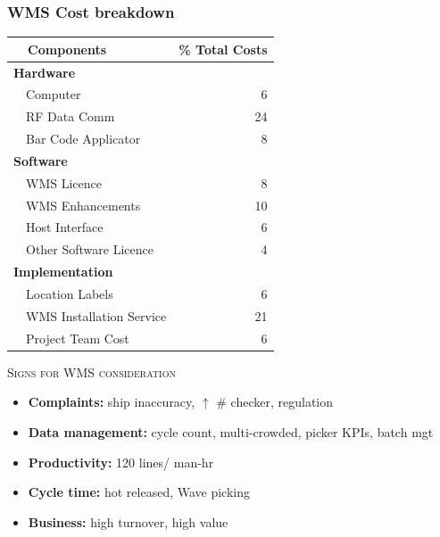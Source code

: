 \documentclass[10pt,handout,notes=show]{beamer}
\begin{document}
\begin{frame}
  \frametitle{WMS Cost breakdown}

          \begin{center}\scriptsize{
            \begin{tabular}{lr} \hline
              ~~Components          & \% Total Costs \\ \hline
              \multicolumn{2}{l}{\textbf{Hardware}} \\
              ~~Computer		        & 6 \\
              ~~RF Data Comm		    & 24 \\
              ~~Bar Code Applicator	& 8 \\
              \multicolumn{2}{l}{\textbf{Software}}  \\
              ~~WMS Licence	        & 8 \\
              ~~WMS Enhancements	  & 10 \\
              ~~Host Interface	    & 6\\
              ~~Other Software Licence	& 4\\
              \multicolumn{2}{l}{\textbf{Implementation}}  \\
              ~~Location Labels	    &6 \\
              ~~WMS Installation Service	& 21\\
              ~~Project Team Cost	  & 6\\ \hline
          \end{tabular}}
        \end{center}

  \NextHalfLine
  \textsc{Signs for  WMS consideration}
  \begin{itemize}
    \item \textbf{Complaints:} ship inaccuracy, $\uparrow$ \# checker, regulation
    \item \textbf{Data management:} cycle count, multi-crowded, picker KPIs, batch mgt
    \item \textbf{Productivity:} 120 lines/ man-hr
    \item \textbf{Cycle time:} hot released, Wave picking
    \item \textbf{Business:} high turnover, high value
  \end{itemize}


\end{frame}
\end{document}
